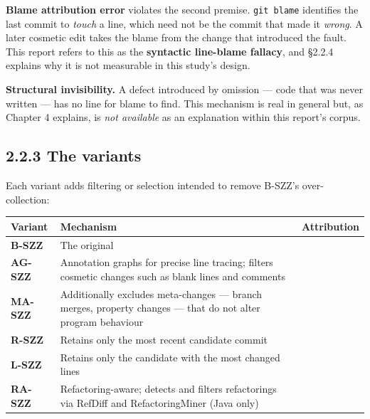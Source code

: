 \textbf{Blame attribution error} violates the second premise.
\texttt{git\ blame} identifies the last commit to \emph{touch} a line,
which need not be the commit that made it \emph{wrong}. A later cosmetic
edit takes the blame from the change that introduced the fault. This
report refers to this as the \textbf{syntactic line-blame fallacy}, and
\S{}2.2.4 explains why it is not measurable in this study's design.

\textbf{Structural invisibility.} A defect introduced by omission ---
code that was never written --- has no line for blame to find. This
mechanism is real in general but, as Chapter 4 explains, is \emph{not
available} as an explanation within this report's corpus.

\subsection{2.2.3 The variants}\label{the-variants}

Each variant adds filtering or selection intended to remove B-SZZ's
over-collection:

\begin{longtable}[]{@{}
  >{\raggedright\arraybackslash}p{}
  >{\raggedright\arraybackslash}p{}
  >{\raggedright\arraybackslash}p{}@{}}
\toprule\noalign{}
\begin{minipage}[b]{\linewidth}\raggedright
Variant
\end{minipage} & \begin{minipage}[b]{\linewidth}\raggedright
Mechanism
\end{minipage} & \begin{minipage}[b]{\linewidth}\raggedright
Attribution
\end{minipage} \\
\midrule\noalign{}
\endhead
\bottomrule\noalign{}
\endlastfoot
\textbf{B-SZZ} & The original & \citet{sliwerski2005szz} \\
\textbf{AG-SZZ} & Annotation graphs for precise line tracing; filters
cosmetic changes such as blank lines and comments &
\citet{kim2006agszz} \\
\textbf{MA-SZZ} & Additionally excludes meta-changes --- branch merges,
property changes --- that do not alter program behaviour &
\citet{dacosta2017maszz} \\
\textbf{R-SZZ} & Retains only the most recent candidate commit &
\citet{davies2014rlszz} \\
\textbf{L-SZZ} & Retains only the candidate with the most changed lines
& \citet{davies2014rlszz} \\
\textbf{RA-SZZ} & Refactoring-aware; detects and filters refactorings
via RefDiff and RefactoringMiner (Java only) & \citet{neto2018raszz} \\
\end{longtable}

